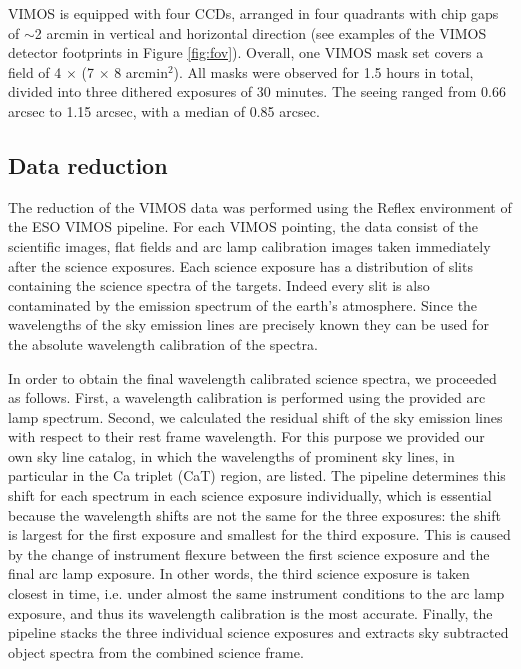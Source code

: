\documentclass[useAMS,usenatbib]{mn2e}
\begin{document}
VIMOS is equipped with four CCDs, arranged in four quadrants with chip gaps of 
$\sim$2 arcmin in vertical and horizontal direction (see examples of the VIMOS 
detector footprints in Figure \ref{fig:fov}). Overall, one VIMOS mask set 
covers a field of 4 $\times$ (7 $\times$ 8 arcmin$^2$). All masks were observed 
for 1.5 hours in total, divided into three dithered exposures of 30 minutes. 
The seeing ranged from 0.66 arcsec to 1.15 arcsec, with a median of 0.85 arcsec. 

\subsection{Data reduction}

The reduction of the VIMOS data was performed using the Reflex 
environment \citep{Freudling13} of the ESO VIMOS pipeline. 
For each VIMOS pointing, the data consist of the scientific images, flat fields and
arc lamp calibration images taken immediately after the science 
exposures. Each science exposure has a distribution of slits containing the 
science spectra of the targets. Indeed every slit is also contaminated by the 
emission spectrum of the earth's atmosphere. Since the wavelengths of the 
sky emission lines are precisely known they can be used for the absolute 
wavelength calibration of the spectra.

In order to obtain the final wavelength calibrated science spectra, we 
proceeded as follows. First, a wavelength calibration 
is performed using the provided arc lamp spectrum. Second, we calculated the residual 
shift of the sky emission lines with respect to their rest frame wavelength. 
For this purpose we provided our own sky line catalog, in which 
the wavelengths of prominent sky lines, in particular in the Ca triplet (CaT)
region, are listed. The pipeline determines this shift for each spectrum in 
each science exposure individually, which is essential because the wavelength 
shifts are not the same for the three exposures: the shift is largest for the 
first exposure and smallest for the third exposure. This 
is caused by the 
change of instrument flexure between the first science exposure and the final 
arc lamp exposure. In other words, the third science exposure is taken 
closest in time, i.e. under almost the same instrument conditions to the arc 
lamp exposure, and thus its wavelength calibration is the most accurate. 
Finally, the pipeline stacks the three individual science exposures and 
extracts sky subtracted object spectra from the combined science frame.
\end{document}

